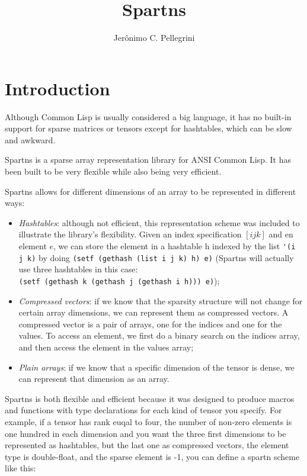 \documentclass{article}
\title{Spartns}
\author{Jerônimo C. Pellegrini}
\begin{document}
\maketitle

\section{Introduction}

Although Common Lisp is usually considered a big language, it has no built-in
support for sparse matrices or tensors except for hashtables, which can be
slow and awkward.

Spartns is a sparse array representation library for ANSI Common Lisp.
It has been built to be very flexible while also being very efficient.

Spartns allows for different dimensions of an array to be represented in different ways:

\begin{itemize}
\item {\em Hashtables}: although not efficient, this representation scheme was included to illustrate the library's
      flexibility. Given an index specification $[i j k]$ and en element $e$, we can store the element in a hashtable h
      indexed by the list \verb+'(i j k)+ by doing \verb+(setf (gethash (list i j k) h) e)+ (Spartns will actually use
      three hashtables in this case:\\ \verb+(setf (gethash k (gethash j (gethash i h))) e)+);
\item {\em Compressed vectors}: if we know that the sparsity structure will not change for certain array dimensions,
      we can represent them as compressed vectors. A compressed vector is a pair of arrays, one for the indices and one
      for the values. To access an element, we first do a binary search on the indices array, and then access the element
      in the values array;
\item {\em Plain arrays}: if we know that a specific dimension of the tensor is dense, we can represent that dimension
      as an array.
\end{itemize}

Spartns is both flexible and efficient because it was designed to produce macros and functions
with type declarations for each kind of tensor you specify. For example, if a tensor
has rank euqal to four, the number of non-zero elements is one hundred in each dimension
and you want the three first dimensions to be represented as
hashtables, but the last one as compressed vectors, the element type is double-float,
and the sparse element is -1, you can define a spartn scheme like this:
\end{document}
